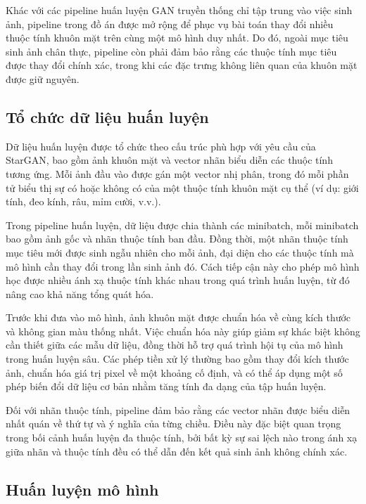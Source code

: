 \documentclass[../DoAn.tex]{subfiles}
\begin{document}
Khác với các pipeline huấn luyện GAN truyền thống chỉ tập trung vào việc sinh ảnh, pipeline trong đồ án được mở rộng để phục vụ bài toán thay đổi nhiều thuộc tính khuôn mặt trên cùng một mô hình duy nhất. Do đó, ngoài mục tiêu sinh ảnh chân thực, pipeline còn phải đảm bảo rằng các thuộc tính mục tiêu được thay đổi chính xác, trong khi các đặc trưng không liên quan của khuôn mặt được giữ nguyên.

\subsection{Tổ chức dữ liệu huấn luyện}

Dữ liệu huấn luyện được tổ chức theo cấu trúc phù hợp với yêu cầu của StarGAN, bao gồm ảnh khuôn mặt và vector nhãn biểu diễn các thuộc tính tương ứng. Mỗi ảnh đầu vào được gán một vector nhị phân, trong đó mỗi phần tử biểu thị sự có hoặc không có của một thuộc tính khuôn mặt cụ thể (ví dụ: giới tính, đeo kính, râu, mỉm cười, v.v.).

Trong pipeline huấn luyện, dữ liệu được chia thành các minibatch, mỗi minibatch bao gồm ảnh gốc và nhãn thuộc tính ban đầu. Đồng thời, một nhãn thuộc tính mục tiêu mới được sinh ngẫu nhiên cho mỗi ảnh, đại diện cho các thuộc tính mà mô hình cần thay đổi trong lần sinh ảnh đó. Cách tiếp cận này cho phép mô hình học được nhiều ánh xạ thuộc tính khác nhau trong quá trình huấn luyện, từ đó nâng cao khả năng tổng quát hóa.


Trước khi đưa vào mô hình, ảnh khuôn mặt được chuẩn hóa về cùng kích thước và không gian màu thống nhất. Việc chuẩn hóa này giúp giảm sự khác biệt không cần thiết giữa các mẫu dữ liệu, đồng thời hỗ trợ quá trình hội tụ của mô hình trong huấn luyện sâu. Các phép tiền xử lý thường bao gồm thay đổi kích thước ảnh, chuẩn hóa giá trị pixel về một khoảng cố định, và có thể áp dụng một số phép biến đổi dữ liệu cơ bản nhằm tăng tính đa dạng của tập huấn luyện.

Đối với nhãn thuộc tính, pipeline đảm bảo rằng các vector nhãn được biểu diễn nhất quán về thứ tự và ý nghĩa của từng chiều. Điều này đặc biệt quan trọng trong bối cảnh huấn luyện đa thuộc tính, bởi bất kỳ sự sai lệch nào trong ánh xạ giữa nhãn và thuộc tính đều có thể dẫn đến kết quả sinh ảnh không chính xác.

\subsection{Huấn luyện mô hình}
\end{document}
